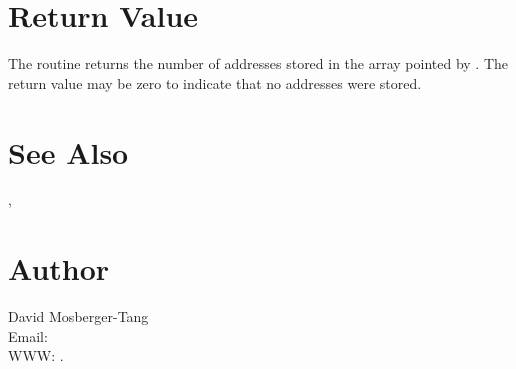 \documentclass{article}
\begin{document}
\section{Return Value}

The routine returns the number of addresses stored in the array pointed by
. The return value may be zero to indicate that no addresses were
stored.

\section{See Also}

,

\section{Author}

\noindent
David Mosberger-Tang\\
Email: \\
WWW: .
\LatexManEnd
\end{document}
